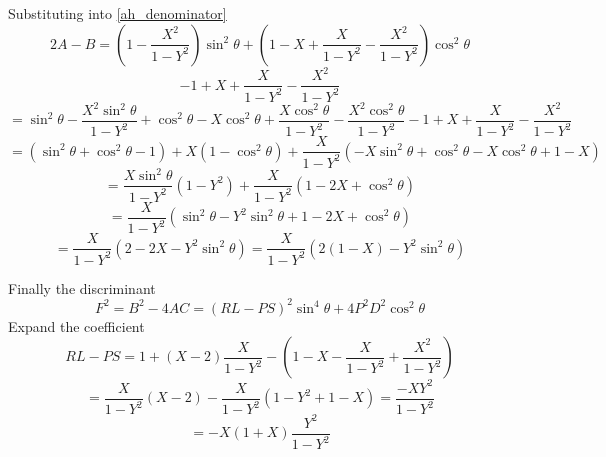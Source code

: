 Substituting into \eqref{ah_denominator}
\begin{equation*}
	2A - B = \left( 1 - \frac{X^2}{1 - Y^2} \right) \sin^2 \theta + \left( 1 - X + \frac{X}{1 - Y^2} - \frac{X^2}{1 - Y^2} \right) \cos^2 \theta
\end{equation*}
\begin{equation*}
	 - 1 + X + \frac{X}{1 - Y^2} - \frac{X^2}{1 - Y^2}
\end{equation*}
\begin{equation*}
	= \sin^2 \theta - \frac{X^2 \sin^2 \theta}{1 - Y^2} + \cos^2 \theta - X \cos^2 \theta + \frac{X \cos^2 \theta}{1 - Y^2} - \frac{X^2 \cos^2 \theta}{1 - Y^2} - 1 + X + \frac{X}{1 - Y^2} - \frac{X^2}{1 - Y^2}
\end{equation*}
\begin{equation*}
	= \left( \sin^2 \theta + \cos^2 \theta - 1 \right) + X \left( 1 - \cos^2 \theta \right) + \frac{X}{1 - Y^2} \left( -X \sin^2 \theta + \cos^2 \theta - X \cos^2 \theta + 1 - X \right)
\end{equation*}
\begin{equation*}
	= \frac{X \sin^2 \theta }{1 - Y^2} \left( 1 - Y^2 \right) + \frac{X}{1 - Y^2} \left( 1 - 2X + \cos^2 \theta \right)
\end{equation*}
\begin{equation*}
	= \frac{X}{1 - Y^2} \left( \sin^2 \theta - Y^2\sin^2 \theta + 1 - 2X + \cos^2 \theta \right)
\end{equation*}
\begin{equation}
	= \frac{X}{1 - Y^2} \left( 2 - 2X - Y^2 \sin^2 \theta \right) = \frac{X}{1 - Y^2} \left( 2 \left( 1 - X \right) - Y^2 \sin^2 \theta \right)
\end{equation}

Finally the discriminant
\begin{equation*}
	F^2 = B^2 - 4AC = \left( RL - PS \right)^2 \sin^4 \theta + 4 P^2 D^2 \cos^2 \theta
\end{equation*}
Expand the coefficient
\begin{equation*}
	RL - PS = 1 + \left( X - 2 \right) \frac{X}{1 - Y^2} - \left( 1 - X - \frac{X}{1 - Y^2} + \frac{X^2}{1 - Y^2} \right)
\end{equation*}
\begin{equation*}
	= \frac{X}{1 - Y^2} \left( X - 2 \right) - \frac{X}{1 - Y^2} \left( 1 - Y^2 + 1 - X\right) = \frac{-XY^2}{1 - Y^2}
\end{equation*}
\begin{equation}
	= -X \left( 1 + X \right) \frac{Y^2}{1 - Y^2}
\end{equation}

